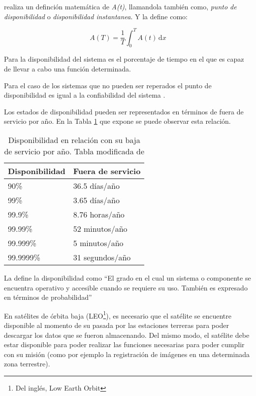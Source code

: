 \cite{FTDesign} realiza un definción matemática de \textit{A(t)}, llamandola también como, 
\textit{punto de disponibilidad} o \textit{disponibilidad instantanea}. Y la define como:

$$A(T) = \frac{1}{T} \int_0^T \! A(t) \, \mathrm{d}x $$

Para \cite{Hanmer07} la disponibilidad del sistema es el porcentaje de tiempo en el que es capaz de 
llevar a cabo una función determinada. 

Para el caso de los sistemas que no pueden ser reperados el punto de disponibilidad es igual a la 
confiabilidad del sistema \citep{FTDesign}.

Los estados de disponibilidad pueden ser representados en términos de fuera de servicio por año. En 
la Tabla \ref{table:avalVSdowntime} que expone \cite{FTDesign} se puede observar esta relación.

\begin{table}[h]
  \centering
  \begin{tabular}{l|l}
    \hline
    Disponibilidad & Fuera de servicio \\ \hline
    90\%           & 36.5 días/año     \\
    99\%           & 3.65 días/año     \\
    99.9\%         & 8.76 horas/año    \\
    99.99\%        & 52 minutos/año    \\
    99.999\%       & 5 minutos/año     \\
    99.9999\%      & 31 segundos/año   \\ \hline
  \end{tabular}
  \caption{Disponibilidad en relación con su baja de servicio por año. Tabla 
modificada de \protect\cite{FTDesign}}
  \label{table:avalVSdowntime}
\end{table}

La \cite{IEEE610.12} define la disponibilidad como ``El grado en el cual un sistema o 
componente se encuentra operativo y accesible cuando se requiere su uso. También es expresado en 
términos de probabilidad''

En satélites de órbita baja (LEO\footnote{Del inglés, Low Earth Orbit}), es necesario que el 
satélite se encuentre disponible al momento de su pasada por las estaciones terreras para poder 
descargar los datos que se fueron almacenando. Del mismo modo, el satélite debe estar disponible 
para poder realizar las funciones necesarias para poder cumplir con su misión (como por ejemplo la 
registración de imágenes en una determinada zona terrestre). 


